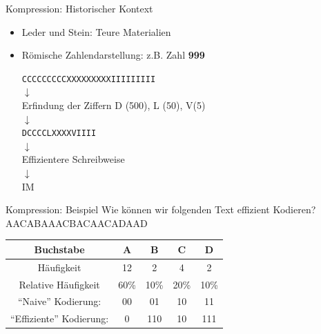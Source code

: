 \begin{frame}{Kompression: Historischer Kontext}
	\begin{itemize}
		\item Leder und Stein: Teure Materialien
		\item Römische Zahlendarstellung: z.B. Zahl \textbf{999}
		\begin{center}
			\texttt{CCCCCCCCCXXXXXXXXXIIIIIIIII}\\
			$\downarrow$\\
			Erfindung der Ziffern D (500), L (50), V(5)\\
			$\downarrow$\\
			\texttt{DCCCCLXXXXVIIII} \\
			$\downarrow$\\
			Effizientere Schreibweise\\
			$\downarrow$\\
			IM
		\end{center}
	\end{itemize}
\end{frame}


\begin{frame}{Kompression: Beispiel}
	\centering
	Wie können wir folgenden Text effizient Kodieren?\\[.5cm]
	AACABAAACBACAACADAAD
	
	\begin{table}[H]
		\begin{tabular}{c|c|c|c|c}
			\textbf{Buchstabe} & \textbf{A} & \textbf{B} & \textbf{C} & \textbf{D} \\\midrule\midrule
			Häufigkeit & 12 &  2 & 4 & 2 \\\hline
			Relative Häufigkeit & 60\% & 10\% & 20\% & 10\% \\\hline
			``Naive'' Kodierung: & 00 & 01 & 10 & 11 \\\hline
			``Effiziente'' Kodierung: & 0 & 110  & 10&  111\\
		\end{tabular}

	\end{table}
\end{frame}

